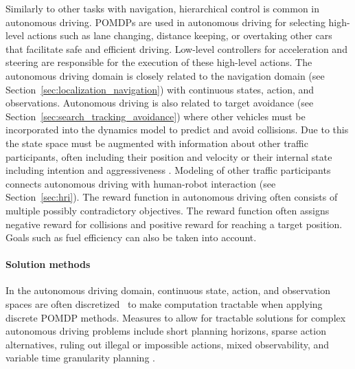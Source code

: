 \documentclass[journal]{IEEEtran}
\begin{document}
Similarly to other tasks with navigation, hierarchical control is
common in autonomous driving. POMDPs are used in autonomous driving
for selecting high-level actions such as lane changing, distance
keeping, or overtaking other cars that facilitate safe and efficient
driving.  Low-level controllers for acceleration and steering are
responsible for the execution of these high-level actions. The
autonomous driving domain is closely related to the navigation domain
(see Section~\ref{sec:localization_navigation}) with continuous
states, action, and observations. Autonomous driving is also related
to target avoidance (see Section~\ref{sec:search_tracking_avoidance})
where other vehicles must be incorporated into the dynamics model to
predict and avoid collisions. Due to this the state space {must} be
augmented with information about other traffic participants, {often} including
their position and velocity \cite{wei2011point} or
their internal state including intention and aggressiveness
\cite{sunberg2017value}. Modeling of other traffic participants
connects autonomous driving with human-robot interaction {(see Section~\ref{sec:hri})}. The reward function
in autonomous driving often consists of multiple {possibly contradictory} objectives. The reward function often assigns negative
reward for collisions and positive reward for reaching a target
position.
Goals such as fuel efficiency can also be taken into
account.

\paragraph{Solution methods}
In the autonomous driving domain, {continuous state, action, and observation spaces are often discretized~\cite{thornton2018autonomous} to make computation tractable when applying discrete POMDP methods.}
Measures to allow for tractable solutions for complex
autonomous driving problems include short planning horizons, sparse
action alternatives, ruling out illegal or impossible actions,
mixed observability, and variable time granularity planning
\cite{ulbrich2015towards}.
\end{document}
